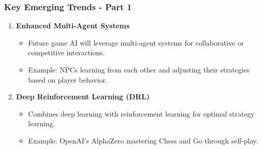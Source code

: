 \documentclass[aspectratio=169]{beamer}
\begin{document}
\begin{frame}[fragile]
    \frametitle{Key Emerging Trends - Part 1}
    \begin{enumerate}
        \item \textbf{Enhanced Multi-Agent Systems}
            \begin{itemize}
                \item Future game AI will leverage multi-agent systems for collaborative or competitive interactions.
                \item Example: NPCs learning from each other and adjusting their strategies based on player behavior.
            \end{itemize}

        \item \textbf{Deep Reinforcement Learning (DRL)}
            \begin{itemize}
                \item Combines deep learning with reinforcement learning for optimal strategy learning.
                \item Example: OpenAI's AlphaZero mastering Chess and Go through self-play.
            \end{itemize}
    \end{enumerate}
\end{frame}
\end{document}
